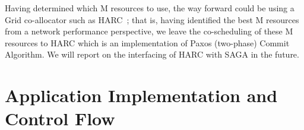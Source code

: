 \documentclass[conference,final]{IEEEtran}
\begin{document}



Having determined which M resources to use, the way forward could be
using a Grid co-allocator such as HARC~\cite{harc_url}; that is,
having identified the best M resources from a network performance
perspective, we leave the co-scheduling of these M resources to HARC
which is an implementation of Paxos (two-phase) Commit Algorithm. We
will report on the interfacing of HARC with SAGA in the future.


\section{Application Implementation and Control Flow} 
\end{document}
